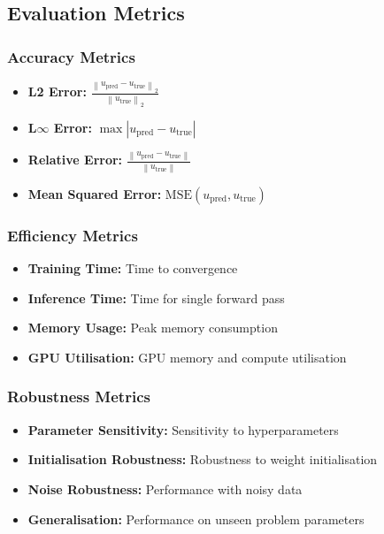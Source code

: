 \documentclass[12pt,a4paper]{article}
\newcommand{\norm}[1]{\left\|#1\right\|}
\theoremstyle{definition}
\begin{document}
\subsection{Evaluation Metrics}

\subsubsection{Accuracy Metrics}

\begin{itemize}
    \item \textbf{L2 Error:} $\frac{\norm{u_{\text{pred}} - u_{\text{true}}}_2}{\norm{u_{\text{true}}}_2}$
    \item \textbf{L$\infty$ Error:} $\max|u_{\text{pred}} - u_{\text{true}}|$
    \item \textbf{Relative Error:} $\frac{\norm{u_{\text{pred}} - u_{\text{true}}}}{\norm{u_{\text{true}}}}$
    \item \textbf{Mean Squared Error:} $\text{MSE}(u_{\text{pred}}, u_{\text{true}})$
\end{itemize}

\subsubsection{Efficiency Metrics}

\begin{itemize}
    \item \textbf{Training Time:} Time to convergence
    \item \textbf{Inference Time:} Time for single forward pass
    \item \textbf{Memory Usage:} Peak memory consumption
    \item \textbf{GPU Utilisation:} GPU memory and compute utilisation
\end{itemize}

\subsubsection{Robustness Metrics}

\begin{itemize}
    \item \textbf{Parameter Sensitivity:} Sensitivity to hyperparameters
    \item \textbf{Initialisation Robustness:} Robustness to weight initialisation
    \item \textbf{Noise Robustness:} Performance with noisy data
    \item \textbf{Generalisation:} Performance on unseen problem parameters
\end{itemize}
\end{document}
